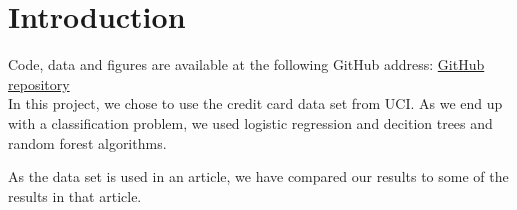 \section{Introduction}
Code, data and figures are available at the following GitHub address:
\href{https://github.com/geirtul/fys-stk4155/tree/master/project3}{GitHub repository}\\

In this project, we chose to use the credit card data set from UCI.
As we end up with a classification problem, we used logistic regression 
and decition trees and random forest algorithms. 

As the data set is used in an article, we have compared our results to 
some of the results in that article. 



